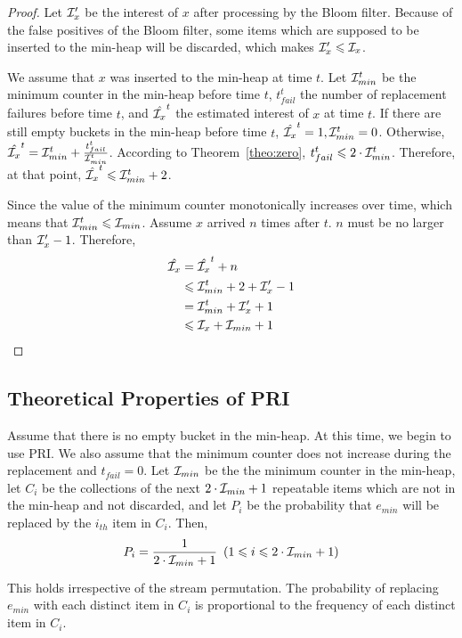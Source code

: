 \begin{proof}
Let $\mathcal{I}_x^\prime$ be the interest of $x$ after processing by the Bloom filter. Because of the false positives of the Bloom filter, some items which are supposed to be inserted to the min-heap will be discarded, which makes $\mathcal{I}_x^\prime \leqslant \mathcal{I}_x$.

We assume that $x$ was inserted to the min-heap at time $t$. 
Let $\mathcal{I}_{min}^t$ be the minimum counter in the min-heap before time $t$, $t_{fail}^t$ the number of replacement failures before time $t$, and $\hat{\mathcal{I}_x}^t$ the estimated interest of $x$ at time $t$. If there are still empty buckets in the min-heap before time $t$, $\hat{\mathcal{I}_x}^t = 1, \mathcal{I}_{min}^t = 0$. 
Otherwise, $\hat{\mathcal{I}_x}^t = \mathcal{I}_{min}^t + \frac{t_{fail}^t}{\mathcal{I}_{min}^t}$.
According to Theorem~\ref{theo:zero}, $t_{fail}^t \leqslant 2\cdot\mathcal{I}_{min}^t$. 
Therefore, at that point, $\hat{\mathcal{I}_x}^t \leqslant \mathcal{I}_{min}^t + 2$.

Since the value of the minimum counter monotonically increases over time, which means that $\mathcal{I}_{min}^t \leqslant \mathcal{I}_{min}$. Assume $x$ arrived $n$ times after $t$. 
$n$ must be no larger than $\mathcal{I}_x^\prime - 1$.
Therefore,
\begin{equation}
\begin{aligned}
\centering  
\hat{\iii_x} &= \hat{\iii_x}^t + n\\
&\leqslant \iii_{min}^t + 2 + \iii_x^\prime - 1\\ 
&= \iii_{min}^t + \iii_x^\prime + 1\\ &\leqslant \iii_x + \iii_{min} + 1
\end{aligned}
\end{equation}
\end{proof}


\presub
\subsection{Theoretical Properties of PRI}
\postsub


\begin{theorem}
	\label{theo:second}
	Assume that there is no empty bucket in the min-heap. At this time, we begin to use PRI. We also assume that the minimum counter does not increase during the replacement and $t_{fail} = 0$. Let $\mathcal{I}_{min}$ be the the minimum counter in the min-heap, let $C_i$ be the collections of the next $2\cdot\mathcal{I}_{min} + 1$ repeatable items which are not in the min-heap and not discarded, and let $P_i$ be the probability that $e_{min}$ will be replaced by the $i_{th}$ item in $C_i$. Then, 
	\begin{equation}
    \begin{aligned}
    P_i = \frac{1}{2\cdot\mathcal{I}_{min}+1} \ \left(1 \leqslant i \leqslant 2\cdot\mathcal{I}_{min}+1\right)
    \end{aligned}
    \end{equation}

This holds irrespective of the stream permutation.
The probability of replacing $e_{min}$ with each distinct item in $C_i$ is proportional to the frequency of each distinct item in $C_i$.
\end{theorem}

